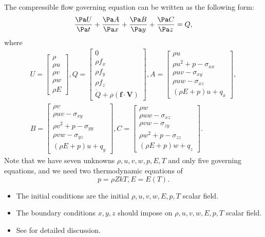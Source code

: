 \begin{refsection}
\begin{lemma}\cite[26]{zikanov2010essential}
	The compressible flow governing equation can be written as the following form:
	$$\frac{\Pa U}{\Pa t} + \frac{\Pa A}{\Pa x} + \frac{\Pa B}{\Pa y} + \frac{\Pa C}{\Pa z} = Q,$$
	where
	\begin{align*}
	U = \begin{bmatrix}
	\rho\\
	\rho u \\
	\rho v\\
	\rho w\\
	\rho E
	\end{bmatrix},
	Q = \begin{bmatrix}
	0\\
	\rho f_x \\
	\rho f_y\\
	\rho f_z\\
	\dot{Q} + \rho(\bm{f}\cdot \bm{V})
	\end{bmatrix},
	A = \begin{bmatrix}
	\rho u\\
	\rho u^2 + p -\sigma_{xx} \\
	\rho uv - \sigma_{xy}\\
	\rho uw - \sigma_{xz}\\
	(\rho E + p) u + q_x
	\end{bmatrix},\\
	B = \begin{bmatrix}
	\rho v\\
	\rho uv -\sigma_{xy} \\
	\rho v^2 + p - \sigma_{yy}\\
	\rho vw - \sigma_{yz}\\
	(\rho E + p) u + q_y
	\end{bmatrix},
	C = \begin{bmatrix}
	\rho w\\
	\rho uw  -\sigma_{xz} \\
	\rho vw - \sigma_{zy}\\
	\rho w^2 + p - \sigma_{zz}\\
	(\rho E + p) w + q_z
	\end{bmatrix}.
	\end{align*}
	Note that we have seven unknowns $\rho,u,v,w,p,E, T$ and only five governing equations, and we need two thermodynamic equations \cite[21]{zikanov2010essential}  of
	$$p = \rho ZkT, E = E(T).$$
\end{lemma}

\begin{remark}\hfill
	\begin{itemize}
		\item The initial conditions are the initial $\rho, u,v, w, E, p, T$ scalar field. 
		\item The boundary conditions $x,y,z$ should impose on $\rho, u,v, w, E, p, T$ scalar field.  
		\item See \cite[26]{zikanov2010essential} for detailed discussion.
	\end{itemize}
\end{remark}


\end{refsection}
